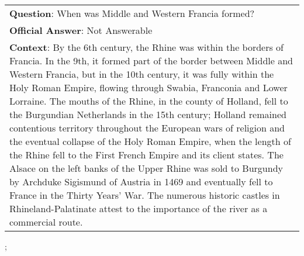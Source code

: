 \begin{figure*}[ht]
{\begin{tabular}{p{}}
            \textbf{Question}: When was Middle and Western Francia formed?                                                                                                                                                                                                                                                                                                                                                                                                                                                                                                                                                                                                                                                                                                                                                                                                                                                        \\
            \textbf{Official Answer}: Not Answerable                                                                                                                                                                                                                                                                                                                                                                                                                                                                                                                                                                                                                                                                                                                                                                                                                                                                              \\
            \textbf{Context}: By the 6th century, the Rhine was within the borders of Francia. In the 9th, it formed part of the border between Middle and Western Francia, but in the 10th century, it was fully within the Holy Roman Empire, flowing through Swabia, Franconia and Lower Lorraine. The mouths of the Rhine, in the county of Holland, fell to the Burgundian Netherlands in the 15th century; Holland remained contentious territory throughout the European wars of religion and the eventual collapse of the Holy Roman Empire, when the length of the Rhine fell to the First French Empire and its client states. The Alsace on the left banks of the Upper Rhine was sold to Burgundy by Archduke Sigismund of Austria in 1469 and eventually fell to France in the Thirty Years' War. The numerous historic castles in Rhineland-Palatinate attest to the importance of the river as a commercial route. \\
        \end{tabular}
    };
    \label{fig:ex-5ad2b72fd7d075001a42a023}
\end{figure*}

